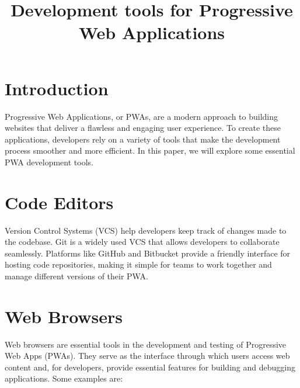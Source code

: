 \documentclass[conference]{IEEEtran}
\begin{document}
\title{Development tools for Progressive Web Applications}

\author{
}

\maketitle

\section*{Introduction}
Progressive Web Applications, or PWAs, are a modern approach to building websites that deliver a flawless and engaging user experience. To create these applications, developers rely on a variety of tools that make the development process smoother and more efficient. In this paper, we will explore some essential PWA development tools.
\section{Code Editors}
Version Control Systems (VCS) help developers keep track of changes made to the codebase. Git is a widely used VCS that allows developers to collaborate seamlessly. Platforms like GitHub and Bitbucket provide a friendly interface for hosting code repositories, making it simple for teams to work together and manage different versions of their PWA.

\section{Web Browsers}
Web browsers are essential tools in the development and testing of Progressive Web Apps (PWAs). They serve as the interface through which users access web content and, for developers, provide essential features for building and debugging applications. Some examples are: 
\end{document}
